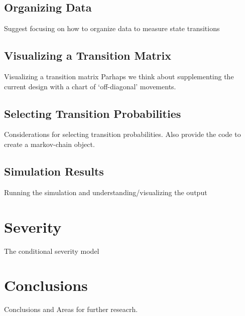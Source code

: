 \documentclass[
]{article}
\begin{document}
\hypertarget{organizing-data}{%
\subsection{Organizing Data}\label{organizing-data}}

Suggest focusing on how to organize data to measure state transitions

\hypertarget{visualizing-a-transition-matrix}{%
\subsection{Visualizing a Transition
Matrix}\label{visualizing-a-transition-matrix}}

Visualizing a transition matrix Parhaps we think about supplementing the
current design with a chart of `off-diagonal' movements.

\hypertarget{selecting-transition-probabilities}{%
\subsection{Selecting Transition
Probabilities}\label{selecting-transition-probabilities}}

Considerations for selecting transition probabilities. Also provide the
code to create a markov-chain object.

\hypertarget{simulation-results}{%
\subsection{Simulation Results}\label{simulation-results}}

Running the simulation and understanding/visualizing the output

\hypertarget{severity}{%
\section{Severity}\label{severity}}

The conditional severity model

\hypertarget{conclusions}{%
\section{Conclusions}\label{conclusions}}

Conclusions and Areas for further reseacrh.
\end{document}
